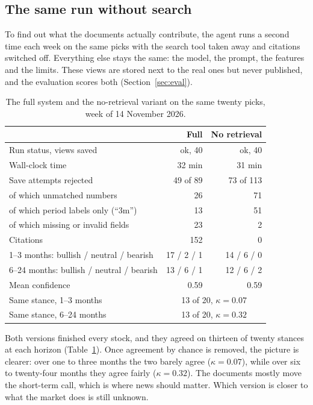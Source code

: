 \documentclass[11pt,a4paper]{article}
\begin{document}
\subsection{The same run without search}

To find out what the documents actually contribute, the agent runs a second time each week on the same
picks with the search tool taken away and citations switched off. Everything else stays the same: the
model, the prompt, the features and the limits. These views are stored next to the real ones but never
published, and the evaluation scores both (Section~\ref{sec:eval}).

\begin{table}[htbp]
\centering\small
\caption{The full system and the no-retrieval variant on the same twenty picks, week of 14 November 2026.}
\label{tab:ablation}
\begin{tabular}{@{}lrr@{}}
\toprule
 & Full & No retrieval \\
\midrule
Run status, views saved & ok, 40 & ok, 40 \\
Wall-clock time & 32 min & 31 min \\
Save attempts rejected & 49 of 89 & 73 of 113 \\
\quad of which unmatched numbers & 26 & 71 \\
\quad of which period labels only (``3m'') & 13 & 51 \\
\quad of which missing or invalid fields & 23 & 2 \\
Citations & 152 & 0 \\
1--3 months: bullish / neutral / bearish & 17 / 2 / 1 & 14 / 6 / 0 \\
6--24 months: bullish / neutral / bearish & 13 / 6 / 1 & 12 / 6 / 2 \\
Mean confidence & 0.59 & 0.59 \\
\midrule
Same stance, 1--3 months & \multicolumn{2}{c}{13 of 20, $\kappa = 0.07$} \\
Same stance, 6--24 months & \multicolumn{2}{c}{13 of 20, $\kappa = 0.32$} \\
\bottomrule
\end{tabular}
\end{table}

Both versions finished every stock, and they agreed on thirteen of twenty stances at each horizon
(Table~\ref{tab:ablation}). Once agreement by chance is removed, the picture is clearer: over one to three
months the two barely agree ($\kappa = 0.07$), while over six to twenty-four months they agree fairly
($\kappa = 0.32$). The documents mostly move the short-term call, which is where news should matter. Which
version is closer to what the market does is still unknown.
\end{document}
